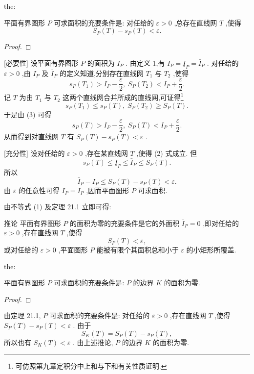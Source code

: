 \begin{theorem}{}{the:}

\end{theorem}
 平面有界图形 \(P\) 可求面积的充要条件是: 对任给的 \(\varepsilon  > 0\) ,总存在直线网 \(T\) ,使得
\[
{S}_{P}\left( T\right)  - {s}_{P}\left( T\right)  < \varepsilon . \tag{2}
\]
\begin{proof}

\end{proof}
[必要性] 设平面有界图形 \(P\) 的面积为 \({I}_{P}\) . 由定义 1,有 \({I}_{P} = {\underline{I}}_{P} = {\bar{I}}_{P}\) . 对任给的 \(\varepsilon  > 0\) ,由 \({I}_{P}\) 及 \({\bar{I}}_{P}\) 的定义知道,分别存在直线网 \({T}_{1}\) 与 \({T}_{2}\) ,使得
\[
{s}_{P}\left( {T}_{1}\right)  > {I}_{P} - \frac{\varepsilon }{2},\;{S}_{P}\left( {T}_{2}\right)  < {I}_{P} + \frac{\varepsilon }{2}. \tag{3}
\]
记 \(T\) 为由 \({T}_{1}\) 与 \({T}_{2}\) 这两个直线网合并所成的直线网,可证得\footnote{可仿照第九章定积分中上和与下和有关性质证明.}
\[
{s}_{P}\left( {T}_{1}\right)  \leq  {s}_{P}\left( T\right) ,\;{S}_{P}\left( {T}_{2}\right)  \geq  {S}_{P}\left( T\right) .
\]
于是由 (3) 可得
\[
{s}_{P}\left( T\right)  > {I}_{P} - \frac{\varepsilon }{2},\;{S}_{P}\left( T\right)  < {I}_{P} + \frac{\varepsilon }{2}.
\]
从而得到对直线网 \(T\) 有 \({S}_{P}\left( T\right)  - {s}_{P}\left( T\right)  < \varepsilon\) .

[充分性] 设对任给的 \(\varepsilon  > 0\) ,存在某直线网 \(T\) ,使得 (2) 式成立. 但
\[
{s}_{P}\left( T\right)  \leq  {\underline{I}}_{P} \leq  {\bar{I}}_{P} \leq  {S}_{P}\left( T\right) .
\]
所以
\[
{\bar{I}}_{P} - {I}_{P} \leq  {S}_{P}\left( T\right)  - {s}_{P}\left( T\right)  < \varepsilon .
\]
由 \(\varepsilon\) 的任意性可得 \({I}_{P} = {\bar{I}}_{P}\) ,因而平面图形 \(P\) 可求面积.

由不等式 (1) 及定理 21.1 立即可得:

推论 平面有界图形 \(P\) 的面积为零的充要条件是它的外面积 \({\bar{I}}_{P} = 0\) ,即对任给的 \(\varepsilon  > 0\) ,存在直线网 \(T\) ,使得
\[
{S}_{P}\left( T\right)  < \varepsilon ,
\]
或对任给的 \(\varepsilon  > 0\) ,平面图形 \(P\) 能被有限个其面积总和小于 \(\varepsilon\) 的小矩形所覆盖.

\begin{theorem}{}{the:}

\end{theorem}
 平面有界图形 \(P\) 可求面积的充要条件是: \(P\) 的边界 \(K\) 的面积为零.

\begin{proof}

\end{proof}
由定理 21.1, \(P\) 可求面积的充要条件是: 对任给的 \(\varepsilon  > 0\) ,存在直线网 \(T\) ,使得 \({S}_{P}\left( T\right)  - {s}_{P}\left( T\right)  < \varepsilon\) . 由于
\[
{S}_{K}\left( T\right)  = {S}_{P}\left( T\right)  - {s}_{P}\left( T\right) ,
\]
所以也有 \({S}_{K}\left( T\right)  < \varepsilon\) . 由上述推论, \(P\) 的边界 \(K\) 的面积为零.

